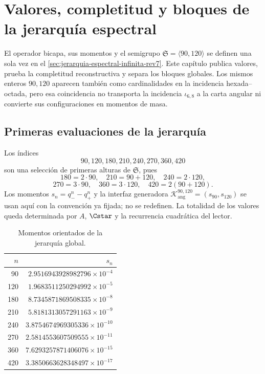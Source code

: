 \chapter{Valores, completitud y bloques de la jerarquía espectral}
\label{chap:torres}

El operador bicapa, sus momentos y el semigrupo
\(\mathfrak S=\langle90,120\rangle\) se definen una sola vez en el
\cref{sec:jerarquia-espectral-infinita-rev7}. Este capítulo publica valores,
prueba la completitud reconstructiva y separa los bloques globales. Los
mismos enteros \(90,120\) aparecen también como cardinalidades en la
incidencia hexada--octada, pero esa coincidencia no transporta la incidencia
\(\iota_{6,8}\) a la carta angular ni convierte sus configuraciones en
momentos de masa.

\section{Primeras evaluaciones de la jerarquía}

Los índices
\[
 90,120,180,210,240,270,360,420
\]
son una selección de primeras alturas de \(\mathfrak S\), pues
\[
 180=2\cdot90,\quad210=90+120,\quad240=2\cdot120,
\]
\[
 270=3\cdot90,\quad360=3\cdot120,
 \quad420=2(90+120).
\]
Los momentos \(s_n=q_-^n-q_+^n\) y la interfaz generadora
\(\mathcal K_{\mathrm{ang}}^{90,120}=(s_{90},s_{120})\) se usan aquí con la
convención ya fijada; no se redefinen. La totalidad de los valores queda
determinada por \(A\), \(\Cstar\) y la recurrencia cuadrática del lector.

\begin{table}[htbp]
\centering
\caption{Momentos orientados de la jerarquía global.}
\label{tab:torres}
\begin{tabular}{@{}rr@{}}
\toprule
\(n\)&\(s_n\)\\
\midrule
90  & \(2.9516943928982796\times10^{-4}\)\\
120 & \(1.9683511250294992\times10^{-5}\)\\
180 & \(8.7345871869508335\times10^{-8}\)\\
210 & \(5.8181313057291163\times10^{-9}\)\\
240 & \(3.8754674969305336\times10^{-10}\)\\
270 & \(2.5814553607509555\times10^{-11}\)\\
360 & \(7.6293257871406076\times10^{-15}\)\\
420 & \(3.3850663628348497\times10^{-17}\)\\
\bottomrule
\end{tabular}
\end{table}

